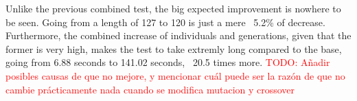 Unlike the previous combined test, the big expected improvement is nowhere
to be seen. Going from a length of 127 to 120 is just a mere ~5.2\% of
decrease. Furthermore, the combined increase of individuals and
generations, given that the former is very high, makes the test to take extremly
long compared to the base, going from 6.88 seconds to 141.02 seconds, ~20.5
times more. 
\textcolor{red}{TODO: Añadir posibles causas de que no mejore, y mencionar cuál
puede ser la razón de que no cambie prácticamente nada cuando se modifica
mutacion y crossover}



